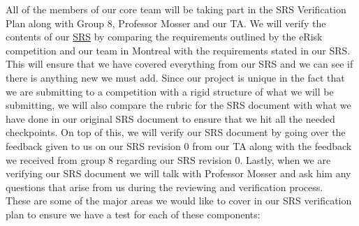 \documentclass[12pt, titlepage]{article}
\begin{document}
  All of the members of our core team will be taking part in the SRS Verification Plan along with Group 8, Professor Mosser and our TA. We will verify the contents of our \href{https://github.com/MichaelBreau/nlp-mentalhealth/blob/main/docs/SRS/index.pdf}{SRS} by comparing the requirements outlined by the eRisk competition and our team in Montreal with the requirements stated in our SRS. This will ensure that we have covered everything from our SRS and we can see if there is anything new we must add. Since our project is unique in the fact that we are submitting to a competition with a rigid structure of what we will be submitting, we will also compare the rubric for the SRS document with what we have done in our original SRS document to ensure that we hit all the needed checkpoints. On top of this, we will verify our SRS document by going over the feedback given to us on our SRS revision 0 from our TA along with the feedback we received from group 8 regarding our SRS revision 0. Lastly, when we are verifying our SRS document we will talk with Professor Mosser and ask him any questions that arise from us during the reviewing and verification process. \\  

  These are some of the major areas we would like to cover in our SRS verification plan to ensure we have a test for each of these components:
  
\end{document}
